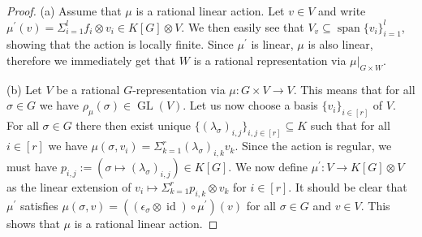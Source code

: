 \begin{proof}
  (a) \; Assume that $\mu$ is a rational linear action.
  Let $v \in V$ and write $\mu^\prime (v) = \Sigma_{i=1}^l f_i \otimes v_i \in K[G] \otimes V$. %
  We then easily see that $V_v \subseteq \operatorname{span}\{v_i\}_{i=1}^l$, showing that the action is locally finite. %
  Since $\mu^\prime$ is linear, $\mu$ is also linear, therefore we immediately get that $W$ is a rational representation via $\left. \mu \right|_{G\times W}$.

  (b) \; Let $V$ be a rational $G$-representation via $\mu \colon G \times V \rightarrow V$.
  This means that for all $\sigma \in G$ we have $\rho_\mu (\sigma) \in \operatorname{GL}(V)$.
  Let us now choose a basis $\{v_i\}_{i \in [r]}$ of $V$.
  For all $\sigma \in G$ there then exist unique $\{ \left( \lambda_\sigma \right)_{i,j}\}_{i,j \in [r]} \subseteq K$ such that for all $i \in [r]$ we have $\mu (\sigma,v_i) = \Sigma_{k=1}^r \left(\lambda_\sigma\right)_{i,k} v_k$.
  Since the action is regular, we must have $p_{i,j} := ( \sigma \mapsto (\lambda_\sigma)_{i,j}) \in K[G]$.
  We now define $\mu^\prime \colon V \rightarrow K[G] \otimes V$ as the linear extension of $v_i \mapsto \Sigma_{k=1}^r p_{i,k} \otimes v_k$ for $i \in [r]$.
  It should be clear that $\mu^\prime$ satisfies $ \mu \left( \sigma , v \right) = \left( \left( \epsilon_\sigma \otimes \operatorname{id} \right) \circ \mu^\prime \right) \left(v\right) $ for all $\sigma \in G$ and $v \in V$.
  This shows that $\mu$ is a rational linear action.
  \end{proof}

